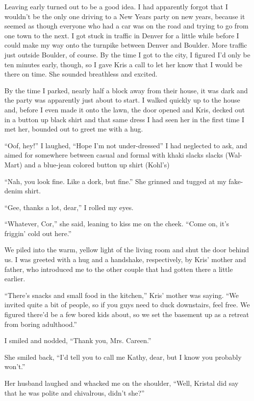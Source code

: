 Leaving early turned out to be a good idea.  I had apparently forgot that I wouldn't be the only one driving to a New Years party on new years, because it seemed as though everyone who had a car was on the road and trying to go from one town to the next.  I got stuck in traffic in Denver for a little while before I could make my way onto the turnpike between Denver and Boulder.  More traffic just outside Boulder, of course.  By the time I got to the city, I figured I'd only be ten minutes early, though, so I gave Kris a call to let her know that I would be there on time.  She sounded breathless and excited.

By the time I parked, nearly half a block away from their house, it was dark and the party was apparently just about to start.  I walked quickly up to the house and, before I even made it onto the lawn, the door opened and Kris, decked out in a button up black shirt and that same dress I had seen her in the first time I met her, bounded out to greet me with a hug.

``Oof, hey!''  I laughed, ``Hope I'm not under-dressed''  I had neglected to ask, and aimed for somewhere between casual and formal with khaki slacks slacks (Wal-Mart) and a blue-jean colored button up shirt (Kohl's)

``Nah, you look fine.  Like a dork, but fine.''  She grinned and tugged at my fake-denim shirt.

``Gee, thanks a lot, dear,'' I rolled my eyes.

``Whatever, Cor,'' she said, leaning to kiss me on the cheek.  ``Come on, it's friggin' cold out here.''

We piled into the warm, yellow light of the living room and shut the door behind us.  I was greeted with a hug and a handshake, respectively, by Kris' mother and father, who introduced me to the other couple that had gotten there a little earlier.

``There's snacks and small food in the kitchen,'' Kris' mother was saying.  ``We invited quite a bit of people, so if you guys need to duck downstairs, feel free.  We figured there'd be a few bored kids about, so we set the basement up as a retreat from boring adulthood.''

I smiled and nodded, ``Thank you, Mrs. Careen.''

She smiled back, ``I'd tell you to call me Kathy, dear, but I know you probably won't.''

Her husband laughed and whacked me on the shoulder, ``Well, Kristal did say that he was polite and chivalrous, didn't she?''

